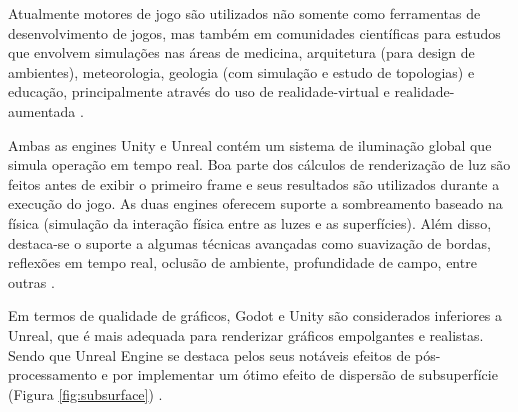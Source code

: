 Atualmente motores de jogo são utilizados não somente como ferramentas de desenvolvimento de jogos, mas também em comunidades científicas para estudos que envolvem simulações nas áreas de medicina, arquitetura (para design de ambientes), meteorologia, geologia (com simulação e estudo de topologias) e educação, principalmente através do uso de \Gls{realidade-virtual} e \Gls{realidade-aumentada} \cite{comparacaoDesempenho2}. 

Ambas as engines Unity e Unreal contém um sistema de iluminação global que simula operação em tempo real. Boa parte dos cálculos de renderização de luz são feitos antes de exibir o primeiro frame e seus resultados são utilizados durante a execução do jogo. As duas engines oferecem suporte a sombreamento baseado na física (simulação da interação física entre as luzes e as superfícies). Além disso, destaca-se o suporte a algumas técnicas avançadas como suavização de bordas, reflexões em tempo real, oclusão de ambiente, profundidade de campo, entre outras \cite{compStudyGE}. 


\begin{quadro}[h!]	
	\centering
\end{quadro}

Em termos de qualidade de gráficos, Godot e Unity são considerados inferiores a Unreal, que é mais adequada para renderizar gráficos empolgantes e realistas. Sendo que Unreal Engine se destaca pelos seus notáveis efeitos de pós-processamento e por implementar um ótimo efeito de dispersão de subsuperfície (Figura \ref{fig:subsurface}) \cite{compStudyGE}.

